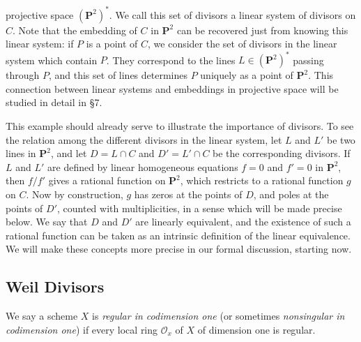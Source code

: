

\DeclareMathOperator{\Div}{Div}


projective space $(\mathbf{P}^2)^*$. We call this set of divisors a linear
system of divisors on $C$. Note that the embedding of $C$ in $\mathbf{P}^2$
can be recovered just from knowing this linear system: if $P$ is a point of
$C$, we consider the set of divisors in the linear system which contain $P$.
They correspond to the lines $L \in (\mathbf{P}^2)^*$ passing through $P$,
and this set of lines determines $P$ uniquely as a point of $\mathbf{P}^2$.
This connection between linear systems and embeddings in projective space
will be studied in detail in \S 7.

This example should already serve to illustrate the importance of divisors.
To see the relation among the different divisors in the linear system, let
$L$ and $L'$ be two lines in $\mathbf{P}^2$, and let $D = L \cap C$ and
$D' = L' \cap C$ be the corresponding divisors. If $L$ and $L'$ are defined
by linear homogeneous equations $f = 0$ and $f' = 0$ in $\mathbf{P}^2$, then
$f/f'$ gives a rational function on $\mathbf{P}^2$, which restricts to a
rational function $g$ on $C$. Now by construction, $g$ has zeros at the
points of $D$, and poles at the points of $D'$, counted with multiplicities,
in a sense which will be made precise below. We say that $D$ and $D'$ are
linearly equivalent, and the existence of such a rational function can be
taken as an intrinsic definition of the linear equivalence. We will make
these concepts more precise in our formal discussion, starting now.

\subsection*{Weil Divisors}

\begin{definition}
We say a scheme $X$ is \emph{regular in codimension one} (or sometimes
\emph{nonsingular in codimension one}) if every local ring
$\mathcal{O}_x$ of $X$ of dimension one is regular.
\end{definition}


